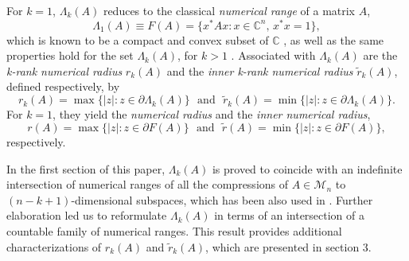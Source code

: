 \documentclass[12pt, reqno]{amsart}
\theoremstyle{definition}
\theoremstyle{remark}
\numberwithin{equation}{section}
\begin{document}
For $k=1$, $\Lambda_{k}(A)$ reduces to the classical  \emph{numerical range} of a matrix $A$,
\[
\Lambda_{1}(A)\equiv F(A)=\{ x^{*}Ax : x\in \mathbb{C}^{n}, \,x^{*}x=1\},
\]
which is known to be a compact and convex subset of $\mathbb{C}$ \cite{H.J.T}, as well as the same properties hold for the set $\Lambda_{k}(A)$, for $k>1$ \cite{Li-Sze,Hugo}. Associated with $\Lambda_{k}(A)$ are the \textit{k-rank numerical radius} $r_{k}(A)$ and the \emph{inner k-rank numerical radius} $\widetilde{r}_{k}(A)$, defined respectively, by
\[
r_{k}(A)=\max{\{|z|: z\in\partial\Lambda_{k}(A)\}}\,\,\,\,\textrm{and}\,\,\,\,\widetilde{r}_{k}(A)=\min{\{|z|: z\in\partial\Lambda_{k}(A)\}}.
\]
For $k=1$, they yield the \textit{numerical radius} and the \emph{inner numerical radius},
\[
r(A)=\max{\{|z|: z\in\partial F(A)\}}\,\,\,\,\textrm{and}\,\,\,\,\widetilde{r}(A)=\min{\{|z|: z\in\partial F(A)\}},
\]
respectively.

In the first section of this paper,  $\Lambda_{k}(A)$ is  proved to coincide with an inde\-finite intersection of  numerical ranges of all the compressions of $A\in\mathcal{M}_{n}$ to $(n-k+1)$-dimensional subspaces, which has been also used in \cite{Aretaki,Aret}. Further elaboration led us to reformulate
$\Lambda_{k}(A)$ in terms of an intersection of a countable family of numerical ranges. This result provides  additional characterizations of   $r_{k}(A)$ and $\widetilde{r}_{k}(A)$, which are presented in section 3.
\end{document}
